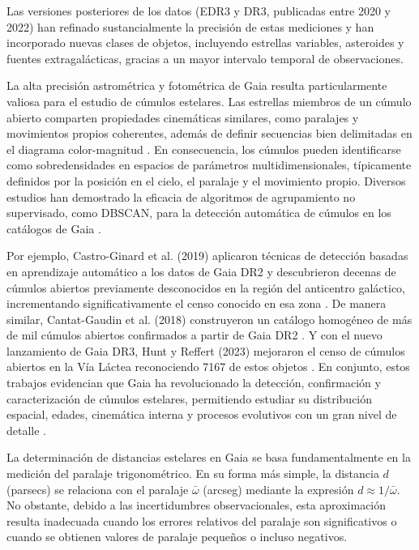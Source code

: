     Las versiones posteriores de los datos (EDR3 y DR3, publicadas entre 2020 y 
    2022) han refinado sustancialmente la precisión de estas mediciones y han 
    incorporado nuevas clases de objetos, incluyendo estrellas variables, 
    asteroides y fuentes extragalácticas, gracias a un mayor intervalo temporal 
    de observaciones.

    La alta precisión astrométrica y fotométrica de Gaia resulta particularmente 
    valiosa para el estudio de cúmulos estelares. Las estrellas miembros de un 
    cúmulo abierto comparten propiedades cinemáticas similares, como paralajes y 
    movimientos propios coherentes, además de definir secuencias bien 
    delimitadas en el diagrama color-magnitud \cite{CastroGinard2019}. En 
    consecuencia, los cúmulos pueden identificarse como sobredensidades en 
    espacios de parámetros multidimensionales, típicamente definidos por la 
    posición en el cielo, el paralaje y el movimiento propio. Diversos estudios 
    han demostrado la eficacia de algoritmos de agrupamiento no supervisado, 
    como DBSCAN, para la detección automática de cúmulos en los catálogos de 
    Gaia \cite{CastroGinard2019}.

    Por ejemplo, Castro-Ginard et al. (2019) aplicaron técnicas de detección 
    basadas en aprendizaje automático a los datos de Gaia DR2 y descubrieron 
    decenas de cúmulos abiertos previamente desconocidos en la región del 
    anticentro galáctico, incrementando significativamente el censo conocido en 
    esa zona \cite{CastroGinard2019}. De manera similar, Cantat-Gaudin et al. 
    (2018) construyeron un catálogo homogéneo de más de mil cúmulos abiertos 
    confirmados a partir de Gaia DR2 \cite{cantat2018gaia}. Y con el nuevo 
    lanzamiento de Gaia DR3, Hunt y Reffert (2023) mejoraron el censo de cúmulos 
    abiertos en la Vía Láctea reconociendo 7167 de estos objetos 
    \cite{hunt2023improving}. En conjunto, estos trabajos evidencian que Gaia ha 
    revolucionado la detección, confirmación y caracterización de cúmulos 
    estelares, permitiendo estudiar su distribución espacial, edades, cinemática 
    interna y procesos evolutivos con un gran nivel de detalle 
    \cite{CastroGinard2019}.

    La determinación de distancias estelares en Gaia se basa fundamentalmente en 
    la medición del paralaje trigonométrico. En su forma más simple, la 
    distancia $d$ (parsecs) se relaciona con el paralaje $\bar{\omega}$ (arcseg) 
    mediante la expresión $d \approx 1 / \bar{\omega}$. No obstante, debido a 
    las incertidumbres observacionales, esta aproximación resulta inadecuada 
    cuando los errores relativos del paralaje son significativos o cuando se 
    obtienen valores de paralaje pequeños o incluso negativos.

